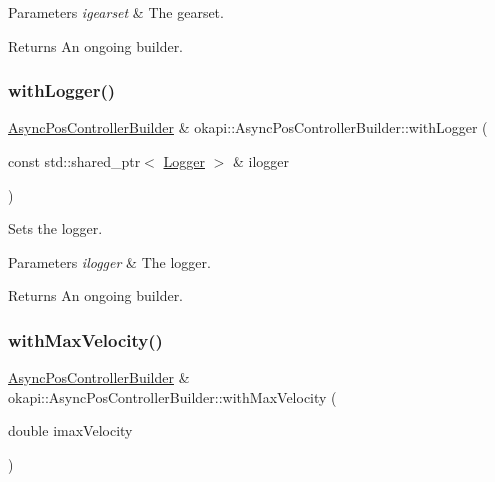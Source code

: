 \begin{DoxyParams}{Parameters}
{\em igearset} & The gearset. \\
\hline
\end{DoxyParams}
\begin{DoxyReturn}{Returns}
An ongoing builder. 
\end{DoxyReturn}
\mbox{\label{classokapi_1_1AsyncPosControllerBuilder_ace47053e63313f56c5646e41e5410335}} 
\subsubsection{\texorpdfstring{withLogger()}{withLogger()}}
{\footnotesize\ttfamily \mbox{\hyperlink{classokapi_1_1AsyncPosControllerBuilder}{Async\+Pos\+Controller\+Builder}} \& okapi\+::\+Async\+Pos\+Controller\+Builder\+::with\+Logger (\begin{DoxyParamCaption}\item[{const std\+::shared\+\_\+ptr$<$ \mbox{\hyperlink{classokapi_1_1Logger}{Logger}} $>$ \&}]{ilogger }\end{DoxyParamCaption})}

Sets the logger.


\begin{DoxyParams}{Parameters}
{\em ilogger} & The logger. \\
\hline
\end{DoxyParams}
\begin{DoxyReturn}{Returns}
An ongoing builder. 
\end{DoxyReturn}
\mbox{\label{classokapi_1_1AsyncPosControllerBuilder_ad95a82910616350d5519fd391143d26d}} 
\subsubsection{\texorpdfstring{withMaxVelocity()}{withMaxVelocity()}}
{\footnotesize\ttfamily \mbox{\hyperlink{classokapi_1_1AsyncPosControllerBuilder}{Async\+Pos\+Controller\+Builder}} \& okapi\+::\+Async\+Pos\+Controller\+Builder\+::with\+Max\+Velocity (\begin{DoxyParamCaption}\item[{double}]{imax\+Velocity }\end{DoxyParamCaption})}

